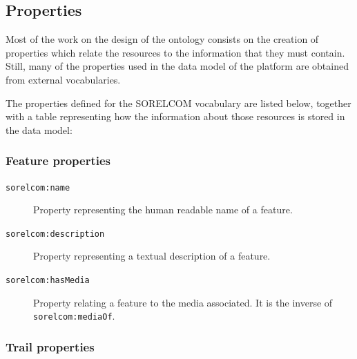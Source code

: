\subsection{Properties}

Most of the work on the design of the ontology consists on the creation of properties which relate the resources to the information that they must contain. Still, many of the properties used in the data model of the platform are obtained from external vocabularies.

The properties defined for the SORELCOM vocabulary are listed below, together with a table representing how the information about those resources is stored in the data model:

\subsubsection*{Feature properties}

\begin{description}
\item[\texttt{sorelcom:name}] Property representing the human readable name of a feature. 
\item[\texttt{sorelcom:description}] Property representing a textual description of a feature.
\item[\texttt{sorelcom:hasMedia}] Property relating a feature to the media associated. It is the inverse of \texttt{sorelcom:mediaOf}.
\end{description}

\subsubsection*{Trail properties}

